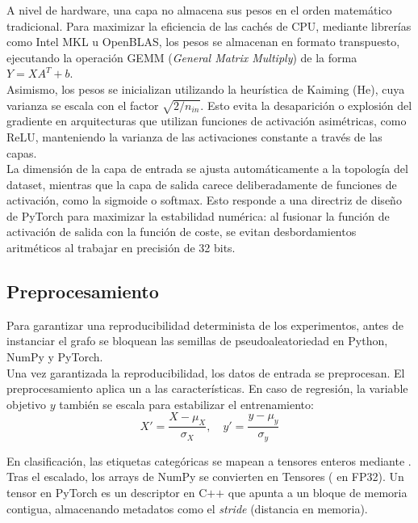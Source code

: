 \documentclass[a4paper,12pt,twoside,final]{book}
\begin{document}
A nivel de hardware, una capa  no almacena sus pesos en el orden matemático tradicional. Para maximizar
la eficiencia de las cachés de CPU, mediante librerías como Intel MKL u OpenBLAS, los pesos se almacenan en formato
transpuesto, ejecutando la operación GEMM (\textit{General Matrix Multiply}) de la forma $Y = X A^T + b$.\\

Asimismo, los pesos se inicializan utilizando la heurística de Kaiming (He), cuya varianza se escala con el factor
$\sqrt{2 / n_{in}}$. Esto evita la desaparición o explosión del gradiente en arquitecturas que utilizan funciones de
activación asimétricas, como ReLU, manteniendo la varianza de las activaciones constante a través de las capas.\\

La dimensión de la capa de entrada se ajusta automáticamente a la topología del dataset, mientras que la capa de salida
carece deliberadamente de funciones de activación, como la sigmoide o softmax. Esto responde a una directriz de diseño
de PyTorch para maximizar la estabilidad numérica: al fusionar la función de activación de salida con la función de
coste, se evitan desbordamientos aritméticos al trabajar en precisión de 32 bits.

\subsection{Preprocesamiento}
Para garantizar una reproducibilidad determinista de los experimentos, antes de instanciar el grafo se bloquean las
semillas de pseudoaleatoriedad en Python, NumPy y PyTorch.\\

Una vez garantizada la reproducibilidad, los datos de entrada se preprocesan. El preprocesamiento aplica un
 a las características. En caso de regresión, la variable objetivo $y$ también se escala para
estabilizar el entrenamiento:
\[
X' = \frac{X - \mu_X}{\sigma_X}, \quad y' = \frac{y - \mu_y}{\sigma_y}
\]

En clasificación, las etiquetas categóricas se mapean a tensores enteros mediante .\\

Tras el escalado, los arrays de NumPy se convierten en Tensores ( en FP32). Un tensor en PyTorch es
un descriptor en C$+$$+$ que apunta a un bloque de memoria contigua, almacenando metadatos como el \textit{stride}
(distancia en memoria).\\
\end{document}
